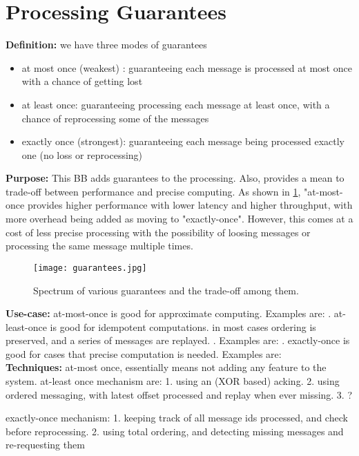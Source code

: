 \section{Processing Guarantees}

	\noindent\textbf{Definition:} we have three modes of guarantees 
	\begin{itemize}
		\item at most once (weakest) : guaranteeing each message is processed at most once with a chance of getting lost
		\item at least once: guaranteeing processing each message at least once, with a chance of reprocessing some of the messages
		\item exactly once (strongest): guaranteeing each message being processed exactly one (no loss or reprocessing)
	\end{itemize}	 

	\noindent \textbf{Purpose:} This BB adds guarantees to the processing. Also, provides a mean to trade-off between performance and precise computing. As shown in \ref{fig:guarantees}, "at-most-once provides higher performance with lower latency and higher throughput, with more overhead being added as moving to "exactly-once". However, this comes at a cost of less precise processing with the possibility of loosing messages or processing the same message multiple times.
	
	\begin{figure}[h]
		\centering
		\texttt{[image: guarantees.jpg]}
		\caption{Spectrum of various guarantees and the trade-off among them. }
		\label{fig:guarantees}
	\end{figure}
	
	
	\noindent \textbf{Use-case:} at-most-once is good for approximate computing. Examples are: . at-least-once is good for idempotent computations. in most cases ordering is preserved, and a series of messages are replayed. . Examples are: .  exactly-once is good for cases that precise computation is needed. Examples are: \\
	

\noindent \textbf{Techniques:} at-most once, essentially means not adding any feature to the system. at-least once mechanism are: 1. using an (XOR based) acking. 2. using ordered messaging, with latest offset processed and replay when ever missing. 3. ?

exactly-once mechanism: 1. keeping track of all message ids processed, and check before reprocessing. 2. using total ordering, and detecting missing messages and re-requesting them 
\\

